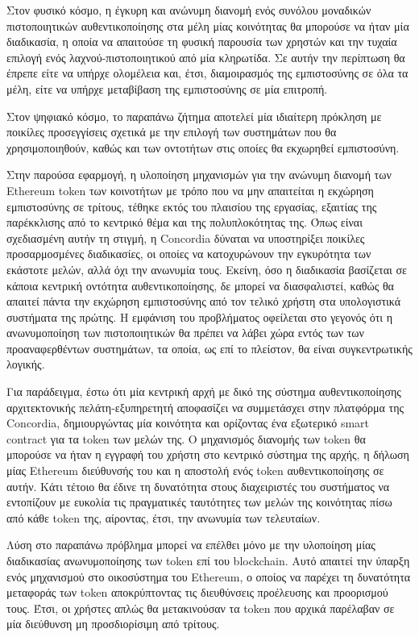 Στον φυσικό κόσμο, η έγκυρη και ανώνυμη διανομή ενός συνόλου μοναδικών πιστοποιητικών αυθεντικοποίησης στα μέλη μίας κοινότητας θα μπορούσε να ήταν μία διαδικασία, η οποία να απαιτούσε τη φυσική παρουσία των χρηστών και την τυχαία επιλογή ενός λαχνού-πιστοποιητικού από μία κληρωτίδα. Σε αυτήν την περίπτωση θα έπρεπε είτε να υπήρχε ολομέλεια και, έτσι, διαμοιρασμός της εμπιστοσύνης σε όλα τα μέλη, είτε να υπήρχε μεταβίβαση της εμπιστοσύνης σε μία επιτροπή.

Στον ψηφιακό κόσμο, το παραπάνω ζήτημα αποτελεί μία ιδιαίτερη πρόκληση με ποικίλες προσεγγίσεις σχετικά με την επιλογή των συστημάτων που θα χρησιμοποιηθούν, καθώς και των οντοτήτων στις οποίες θα εκχωρηθεί εμπιστοσύνη.

Στην παρούσα εφαρμογή, η υλοποίηση μηχανισμών για την ανώνυμη διανομή των Ethereum token των κοινοτήτων με τρόπο που να μην απαιτείται η εκχώρηση εμπιστοσύνης σε τρίτους, τέθηκε εκτός του πλαισίου της εργασίας, εξαιτίας της παρέκκλισης από το κεντρικό θέμα και της πολυπλοκότητας της. Όπως είναι σχεδιασμένη αυτήν τη στιγμή, η Concordia δύναται να υποστηρίξει ποικίλες προσαρμοσμένες διαδικασίες, οι οποίες να κατοχυρώνουν την εγκυρότητα των εκάστοτε μελών, αλλά όχι την ανωνυμία τους. Εκείνη, όσο η διαδικασία βασίζεται σε κάποια κεντρική οντότητα αυθεντικοποίησης, δε μπορεί να διασφαλιστεί, καθώς θα απαιτεί πάντα την εκχώρηση εμπιστοσύνης από τον τελικό χρήστη στα υπολογιστικά συστήματα της πρώτης. Η εμφάνιση του προβλήματος οφείλεται στο γεγονός ότι η ανωνυμοποίηση των πιστοποιητικών θα πρέπει να λάβει χώρα εντός των των προαναφερθέντων συστημάτων, τα οποία, ως επί το πλείστον, θα είναι συγκεντρωτικής λογικής.

Για παράδειγμα, έστω ότι μία κεντρική αρχή με δικό της σύστημα αυθεντικοποίησης αρχιτεκτονικής πελάτη-εξυπηρετητή αποφασίζει να συμμετάσχει στην πλατφόρμα της Concordia, δημιουργώντας μία κοινότητα και ορίζοντας ένα εξωτερικό smart contract για τα token των μελών της. Ο μηχανισμός διανομής των token θα μπορούσε να ήταν η εγγραφή του χρήστη στο κεντρικό σύστημα της αρχής, η δήλωση μίας Ethereum διεύθυνσής του και η αποστολή ενός token αυθεντικοποίησης σε αυτήν. Κάτι τέτοιο θα έδινε τη δυνατότητα στους διαχειριστές του συστήματος να εντοπίζουν με ευκολία τις πραγματικές ταυτότητες των μελών της κοινότητας πίσω από κάθε token της, αίροντας, έτσι, την ανωνυμία των τελευταίων.

Λύση στο παραπάνω πρόβλημα μπορεί να επέλθει μόνο με την υλοποίηση μίας διαδικασίας ανωνυμοποίησης των token επί του blockchain. Αυτό απαιτεί την ύπαρξη ενός μηχανισμού στο οικοσύστημα του Ethereum, ο οποίος να παρέχει τη δυνατότητα μεταφοράς των token αποκρύπτοντας τις διευθύνσεις προέλευσης και προορισμού τους. Έτσι, οι χρήστες απλώς θα μετακινούσαν τα token που αρχικά παρέλαβαν σε μία διεύθυνση μη προσδιορίσιμη από τρίτους.

